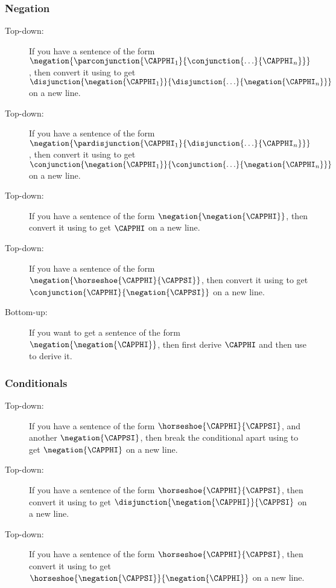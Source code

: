 \subsubsection*{Negation} 
\begin{description}
\item[ Top-down:] If you have a sentence of the form $\negation{\parconjunction{\CAPPHI_1}{\conjunction{\ldots}{\CAPPHI_{\integer{n}}}}}$, then convert it using  to get $\disjunction{\negation{\CAPPHI_1}}{\disjunction{\ldots}{\negation{\CAPPHI_{\integer{n}}}}}$ on a new line.
\item[ Top-down:] If you have a sentence of the form $\negation{\pardisjunction{\CAPPHI_1}{\disjunction{\ldots}{\CAPPHI_{\integer{n}}}}}$, then convert it using  to get $\conjunction{\negation{\CAPPHI_1}}{\conjunction{\ldots}{\negation{\CAPPHI_{\integer{n}}}}}$ on a new line.
\item[ Top-down:] If you have a sentence of the form $\negation{\negation{\CAPPHI}}$, then convert it using  to get $\CAPPHI$ on a new line.
\item[ Top-down:] If you have a sentence of the form $\negation{\horseshoe{\CAPPHI}{\CAPPSI}}$, then convert it using  to get $\conjunction{\CAPPHI}{\negation{\CAPPSI}}$ on a new line.
\item[ Bottom-up:] If you want to get a sentence of the form $\negation{\negation{\CAPPHI}}$, then first derive $\CAPPHI$ and then use  to derive it. 
\end{description} 
\subsubsection*{Conditionals} 
\begin{description}
\item[ Top-down:] If you have a sentence of the form $\horseshoe{\CAPPHI}{\CAPPSI}$, and another $\negation{\CAPPSI}$, then break the conditional apart using  to get $\negation{\CAPPHI}$ on a new line.
\item[ Top-down:] If you have a sentence of the form $\horseshoe{\CAPPHI}{\CAPPSI}$, then convert it using  to get $\disjunction{\negation{\CAPPHI}}{\CAPPSI}$ on a new line.
\item[ Top-down:] If you have a sentence of the form $\horseshoe{\CAPPHI}{\CAPPSI}$, then convert it using  to get $\horseshoe{\negation{\CAPPSI}}{\negation{\CAPPHI}}$ on a new line.
\end{description} 
